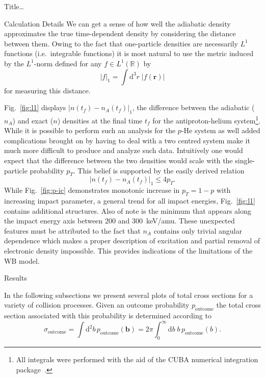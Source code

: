 \documentclass[letterpaper, 11 pt]{report}
\begin{document}
\begin{chapter}{ Title\dots \label{chap:p-he2p-he}}
\begin{section}{Calculation Details \label{sec:phe2p-det}}
      We can get a sense of how well the adiabatic density approximates the true time-dependent density
      by considering the distance between them. Owing to the fact that one-particle densities are 
      necessarily $L^1$ functions (i.e.\ integrable functions) it is most natural to use the metric
      induced by the $L^1$-norm defined for any $f \in L^1\left(\mathbb{R}\right)$ by
      \begin{equation} \label{eq:l1rorm}
         \left| f \right|_1 = \int \mathrm{d}^3 r \; \left| f(\mathbf{r}) \right|
      \end{equation}
      for measuring this distance.
      
      Fig.~\ref{fig:l1} displays $\left| n\left(t_f\right) - n_A\left(t_f\right) \right|_1$, the
      difference between the adiabatic ($n_A$) and exact ($n$) densities at the final time $t_f$ for the
      antiproton-helium system\footnote{All integrals were performed with the aid of the \textsc{CUBA}
      numerical integration package~\cite{cuba}.}. While it is possible to perform such an analysis for
      the $p$-He system as well added complications brought on by having to deal with a two centred
      system make it much more difficult to produce and analyze such data. Intuitively one would expect
      that the difference between the two densities would scale with the single-particle probability
      $p_T$. This belief is supported by the easily derived relation 
      \begin{equation} \label{eq:diff-bound}
         \left| n(t_f) - n_A(t_f) \right|_1 \leq 4 p_T.
      \end{equation}
      While Fig.~\ref{fig:p-ic} demonstrates monotonic increase in $p_T = 1 - p$ with increasing impact
      parameter, a general trend for all impact energies, Fig.~\ref{fig:l1} contains additional
      structures. Also of note is the minimum that appears along the impact energy axis between 200 and
      300~keV/amu. These unexpected features must be attributed to the fact that $n_A$ contains only
      trivial angular dependence which makes a proper description of excitation and partial removal of
      electronic density impossible. This provides indications of the limitations of the WB model.

   \end{section}

   \begin{section}{Results \label{sec:phe2p-res}}

      In the following subsections we present several plots of total cross sections for a variety of
      collision processes. Given an outcome probability $p_\mathrm{outcome}$ the total cross section
      associated with this probability is determined according to
      \begin{equation} \label{eq:tcs}
         \sigma_\mathrm{outcome} = \int \mathrm{d}^2 b \, p_\mathrm{outcome} (\mathbf{b})
         = 2 \pi \int^\infty_0 \mathrm{d}b \; b \, p_\mathrm{outcome} (b).
      \end{equation}
   

\end{section}
\end{chapter}
\end{document}

